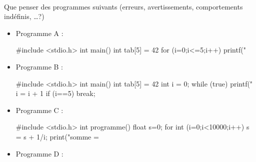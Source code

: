 \documentclass[11pt,a4paper]{article}
\begin{document}
\begin{Exercise}[title={Programmes à commenter}]\\
Que penser des programmes suivants (erreurs, avertissements, comportements indéfinis, \dots ?)
\begin{itemize}
	\item[\textbullet] Programme A :
	\begin{langageC}
#include <stdio.h>
int main()
int tab[5] = {42}
for (i=0;i<=5;i++){
	printf("%
		}
	\end{langageC}
	\item[\textbullet] Programme B :
	\begin{langageC}
#include <stdio.h>
int main(){
int tab[5] = {42}
int i = 0;
while (true)
	{
		printf("%
		i = i + 1
		if (i==5) {break;}
	}
}
	\end{langageC}
	\item[\textbullet] Programme C :
	\begin{langageC}
#include <stdio.h>
int programme() {
	float s=0;
	for int (i=0;i<10000;i++)
	{
		s = s + 1/i;
	}
	print("somme =%
}
	\end{langageC}
	\item[\textbullet] Programme D :
\end{itemize}
\end{Exercise}

\begin{Exercise}[title={A propos de {\tt ++}}]
\end{Exercise}
\end{document}
